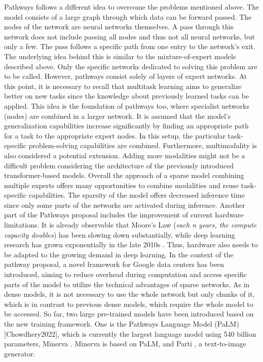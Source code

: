 \documentclass[
]{krantz}
\begin{document}
Pathways follows a different idea to overcome the problems mentioned above. The model consists of a large graph through which data can be forward passed. The nodes of the network are neural networks themselves. A pass through this network does not include passing all nodes and thus not all neural networks, but only a few. The pass follows a specific path from one entry to the network's exit. The underlying idea behind this is similar to the mixture-of-expert models described above. Only the specific networks dedicated to solving this problem are to be called. However, pathways consist solely of layers of expert networks.
At this point, it is necessary to recall that multitask learning aims to generalize better on new tasks since the knowledge about previously learned tasks can be applied. This idea is the foundation of pathways too, where specialist networks (nodes) are combined in a larger network. It is assumed that the model's generalization capabilities increase significantly by finding an appropriate path for a task to the appropriate expert nodes. In this setup, the particular task-specific problem-solving capabilities are combined. Furthermore, multimodality is also considered a potential extension. Adding more modalities might not be a difficult problem considering the architecture of the previously
introduced transformer-based models. Overall the approach of a sparse model combining multiple experts offers many opportunities to combine modalities and reuse task-specific capabilities. The sparsity of
the model offers decreased inference time since only some parts of the networks are activated during inference.
Another part of the Pathways proposal includes the improvement of current hardware limitations. It is already observable that Moore's Law (\emph{each n years, the compute capacity doubles}) has been slowing down substantially, while deep learning research has grown exponentially in the late 2010s \citep{Dean20}. Thus, hardware also needs to be adapted to the growing demand in deep learning. In the context of the pathway proposal, a novel framework for Google data centers has been introduced, aiming to reduce overhead during computation and access specific parts of the model to utilize the technical advantages of sparse networks. As in dense models, it is not necessary to use the whole network but only chunks of it, which is in contrast to previous dense models, which require the whole model to be accessed. So far, two large pre-trained models have been introduced based on the new training framework. One is the Pathways Language Model (PaLM) {[}Chowdhery2022{]}, which is currently the largest
language model using 540 billion parameters, Minerva \citep{Lewkowycz2022}. Minerva is based on PaLM, and Parti \citep{parti}, a text-to-image generator.
\end{document}

